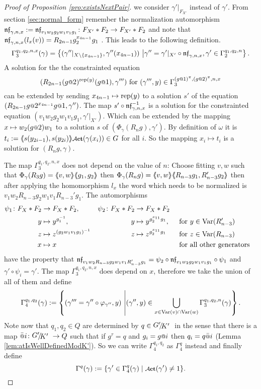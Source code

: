 \documentclass[a4paper,12pt]{article}
\begin{document}
\begin{proof}[Proof of Proposition \ref{pro:existsNextPair}]
 we consider $\gamma'|_{F_{X'}}$ instead of $\gamma'$.
 From section \ref{sec:normal_form} remember the normalization 
 automorphism $\mathfrak{nf}_{\gamma,n,x}:=\mathfrak{nf}_{v_1w_2g_2w_1v_1g_1}\colon F_{X'}*F_2 \to F_{X'}*F_2$
  and note that
 $\mathfrak{nf}_{\gamma,n,x}(l_x(v))=R_{2n-1}g_2^{x_{4n-1}}g_1$ .
 This leads to the following definition.
 \[\Gamma_3^{q_1,q_2,n,x}(\gamma) = \left\{(\gamma''|_{X\setminus\{x_{4n-1}\}},\gamma''(x_{4n-1})) \ \middle \vert
 \gamma''= \gamma'|_{X'} \circ \mathfrak{nf}_{\gamma,n,x},\gamma' \in \Gamma_2^{q_1,q_2,n} \right\}.\] 
 A solution for the the constrainted equation
 \[(R_{2n-1}(g\at2)^{\textup{rep}(y)}(g\at1),\gamma''')\textup{ for }(\gamma''',y) \in \Gamma_3^{(g\at{1})^\pi,(g\at{2})^\pi,n,x}\]
 can be 
 extended by sending $x_{4n-1}\mapsto \textup{rep}(y)$ to a solution $s'$ 
 of the equation $(R_{2n-1} g\at{2}^{x_{4n-1}} g\at{1},\gamma'')$. The map $s'\circ \mathfrak{nf}_{\gamma,n,x}^{-1}$ 
 is a solution for the constrainted equation $(v_1w_2g_2w_1v_1g_1,\gamma'|_{X'})$. Which can be extended by the mapping $x\mapsto w_2(g\at{2})w_1$ to a solution $s$ of $(\Phi_\gamma(R_n g),\gamma')$.
 By definition of $\omega$ it is $t_i:=\pair{s(y_{2i-1}),s(y_{2i})}\act(\gamma(x_i)) \in G$ for all $i$. So the mapping $x_i\mapsto t_i$ is a solution for $(R_ng,\gamma)$.
 
 The map $\Gamma_3^{q_1,q_2,n,x}$ does not depend on the value of $n$: 
 Choose fitting $v,w$ such that $\Phi_\gamma(R_3g)=\langle\negthickspace\langle v,w\rangle\negthickspace\rangle\langle\negthickspace\langle g_1,g_2\rangle\negthickspace\rangle$ then $\Phi_\gamma(R_ng)=\langle\negthickspace\langle v,w\rangle\negthickspace\rangle\langle\negthickspace\langle R_{n-3}g_1,R_{n-3}'g_2\rangle\negthickspace\rangle$ 
 then after applying the homomorphism $l_x$ 
 the word which needs to be normalized is $v_1w_2R_{n-3}g_2w_1v_1R_{n-3}'g_1$. The automorphisms
 \begin{align*}
 \psi_1 \colon F_X*F_2 &\to F_X*F_2, & \psi_2 \colon F_X*F_2 &\to F_X*F_2\\
 y &\mapsto y^{g_1^{-1}}, & y &\mapsto y^{g_2^{x_{11}}g_1}, & &\text{ for }y\in \textup{Var}(R_{n-3}')\\
 z &\mapsto z^{(g_2w_1v_1g_1)^{-1}}& z &\mapsto z^{g_2^{x_{11}}g_1}  & &\text{ for }z\in \textup{Var}(R_{n-3})\\
 x &\mapsto x & & & &\text{ for all other generators}
 \end{align*}
 have the property that $\mathfrak{nf}_{v_1w_2R_{n-3}g_2w_1v_1R_{n-3}'g_1} = \psi_2\circ\mathfrak{nf}_{v_1w_2g_2w_1v_1g_1}\circ \psi_1$ and 
 $\gamma' \circ \psi_i = \gamma'$.
 The map $\Gamma_3^{q_1,q_2,n,x}$ does depend on $x$, therefore we take the union of all of them and define
  \[\Gamma_4^{q_1,q_2}(\gamma) := \left\{(\gamma''' = \gamma''\circ \varphi_{\gamma''},y) \ \middle \vert (\gamma'',y) \in \bigcup_{x\in \textup{Var}(v)\cap\textup{Var}(w)}\Gamma_3^{q_1,q_2,n}(\gamma)\right\}.\]
 Note now that $q_{1},q_2\in Q$ are determined by $q\in\RNK{G'}{K'}$ in the sense that there is a map $\att{i}\colon \RNK{G'}{K'}\to Q$ such that if $g^\tau = q$ and $g_i=g\at{i}$ 
 then $q_i = q\att{i}$ (Lemma \ref{lem:atIsWellDefinedModK'}). So we can write $\Gamma_4^{q_1,q_2}$ as $\Gamma_4^q$ instead and finally define
 \[\Gamma^q(\gamma) := \{\gamma' \in \Gamma_4^q(\gamma) \mid \act(\gamma')\neq 1 \}.\]
 

\end{proof}
\end{document}
